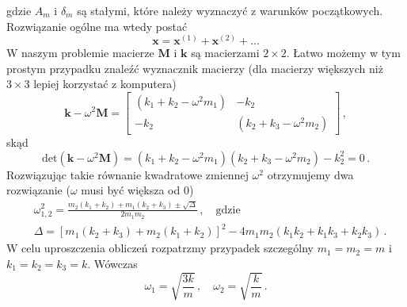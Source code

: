 \documentclass[../main.tex]{subfiles}
\begin{document}
        gdzie \(A_m\) i \(\delta_m\) są stałymi, które należy wyznaczyć z warunków początkowych. Rozwiązanie ogólne ma wtedy postać
        \begin{equation*}
            \mathbf{x}=\mathbf{x}^{(1)}+\mathbf{x}^{(2)}+...
        \end{equation*}
        W naszym problemie macierze \(\mathbf{M}\) i \(\mathbf{k}\) są macierzami \(2\times 2\). Łatwo możemy w tym prostym przypadku znaleźć wyznacznik macierzy (dla macierzy większych niż \(3\times3\) lepiej korzystać z komputera)
        \begin{equation*}
            \mathbf{k}-\omega^2\mathbf{M}=\begin{bmatrix}(k_1+k_2-\omega^2m_1)&-k_2\\-k_2&(k_2+k_3-\omega^2m_2)\end{bmatrix}\,,
        \end{equation*}
        skąd
        \begin{equation*}
            \text{det}(\mathbf{k}-\omega^2\mathbf{M})=(k_1+k_2-\omega^2m_1)(k_2+k_3-\omega^2m_2)-k_2^2=0\,.
        \end{equation*}
        Rozwiązując takie równanie kwadratowe zmiennej \(\omega^2\) otrzymujemy dwa rozwiązanie (\(\omega\) musi być większa od 0)
        \begin{equation*}
        \begin{split}
            &\omega^2_{1,2}=\frac{m_2(k_1+k_2)+m_1(k_2+k_3)\pm\sqrt{\Delta}}{2m_1m_2}\,,\quad\text{gdzie}\\
            &\Delta=\left[m_1(k_2+k_3)+m_2(k_1+k_2)\right]^2-4m_1m_2(k_1k_2+k_1k_3+k_2k_3)\,.
        \end{split}
        \end{equation*}
        W celu uproszczenia obliczeń rozpatrzmy przypadek szczególny \(m_1=m_2=m\) i \(k_1=k_2=k_3=k\). Wówczas
        \begin{equation*}
                \omega_{1}=\sqrt{\frac{3k}{m}}\,,\quad \omega_2=\sqrt{\frac{k}{m}}\,.
        \end{equation*}
\end{document}
